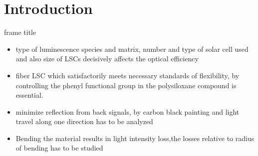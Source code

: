 \documentclass{beamer}
\begin{document}
\section{Introduction}
\begin{frame}{frame title}
\newpage
\begin{itemize}
\item{type of luminescence species and matrix, number and type of solar cell used and also size of LSCs decisively affects the optical efficiency
}
\item{fiber LSC which satisfactorily meets necessary standards of flexibility, by controlling the phenyl functional group in the polysiloxane compound is essential.
}
\item{minimize reflection from back signals, by carbon black painting and light travel along one direction has to be analyzed }
\item{Bending the material results in light intensity loss,the losses relative to radius of bending has to be studied }

\end{itemize}
\end{frame}


\end{document}
